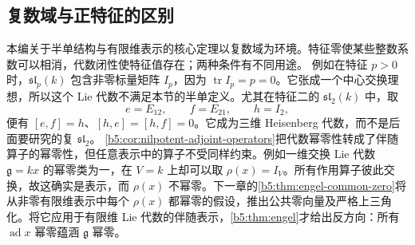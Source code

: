 \subsection{复数域与正特征的区别}
\label{b5:subsec:1104:03}

本编关于半单结构与有限维表示的核心定理以复数域为环境。特征零使某些整数系数可以相消，代数闭性使特征值存在；两种条件有不同用途。
\ProseParagraphBreak
例如在特征 \(p>0\) 时，\(\mathfrak{sl}_p(k)\) 包含非零标量矩阵 \(I_p\)，因为 \(\operatorname{tr}I_p=p=0\)。它张成一个中心交换理想，所以这个 Lie 代数不满足本节的半单定义。尤其在特征二的 \(\mathfrak{sl}_2(k)\) 中，取
\[
	e=E_{12},\qquad f=E_{21},\qquad h=I_2,
\]
便有 \([e,f]=h\)、\([h,e]=[h,f]=0\)。它成为三维 Heisenberg 代数，而不是后面要研究的复 \(\mathfrak{sl}_2\)。
\ProseParagraphBreak
\cref{b5:cor:nilpotent-adjoint-operators}把代数幂零性转成了伴随算子的幂零性，但任意表示中的算子不受同样约束。例如一维交换 Lie 代数 \(\mathfrak g=kx\) 的幂零类为一，在 \(V=k\) 上却可以取 \(\rho(x)=I_V\)。所有作用算子彼此交换，故这确实是表示，而 \(\rho(x)\) 不幂零。下一章的\cref{b5:thm:engel-common-zero}将从非零有限维表示中每个 \(\rho(x)\) 都幂零的假设，推出公共零向量及严格上三角化。将它应用于有限维 Lie 代数的伴随表示，\cref{b5:thm:engel}才给出反方向：所有 \(\operatorname{ad}x\) 幂零蕴涵 \(\mathfrak g\) 幂零。
